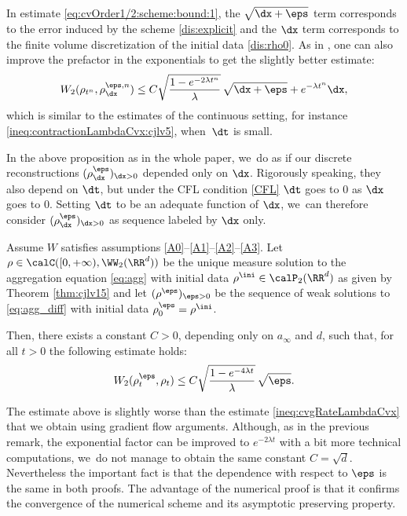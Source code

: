\begin{remark}\mbox{}
In estimate \eqref{eq:cvOrder1/2:scheme:bound:1}, the $\sqrt{\dx + \eps}$ term corresponds to the error induced by the scheme \eqref{dis:explicit} and the $\dx$ term corresponds to the finite volume discretization of the initial data \eqref{dis:rho0}. As in \cite{dlv20}, one can also improve the prefactor in the exponentials to get the slightly better estimate:
\[
W_2(\rho_{t^n},\rho_{\dx}^{\eps,n} ) \leq C \sqrt{\frac{1 - e^{-2\lambda t^n}}{\lambda}}\, \sqrt{\dx + \eps} + e^{-\lambda t^n} \dx,
\]
which is similar to the estimates of the continuous setting, for instance \eqref{ineq:contractionLambdaCvx:cjlv5}, when~$\dt$ is small.
\end{remark}
In the above proposition as in the whole paper, we~do as if our discrete reconstructions $(\rho_{\dx}^\eps)_{\dx >0}$ depended only on $\dx$. Rigorously speaking, they also depend on $\dt$, but under the CFL condition \eqref{CFL} $\dt$ goes to 0 as $\dx$ goes to 0. Setting $\dt$ to be an adequate function of $\dx$, we~can therefore consider $(\rho_{\dx}^\eps)_{\dx >0}$ as sequence labeled by $\dx$ only.
\begin{theorem}\label{thm:cvOrder1/2:scheme}
Assume $W$ satisfies assumptions \eqref{A0}--\eqref{A1}--\eqref{A2}--\eqref{A3}. Let $\rho \in \calC([0,+\infty), \WW_2(\RR^d))$ be the unique measure solution to the aggregation equation \eqref{eq:agg} with initial data $\rho^{\ini} \in \calP_2(\RR^d)$ as given by Theorem \ref{thm:cjlv15} and let $(\rho^\eps)_{\eps > 0}$ be the sequence of weak solutions to \eqref{eq:agg_diff} with initial data $\rho_0^\eps = \rho^{\ini}$.

Then, there exists a constant $C>0$, depending only on $a_\infty$ and $d$, such that, for all $t>0$ the following estimate holds:
\begin{equation}\label{eq:cvOrder1/2:scheme:bound:2}
W_2(\rho_t^\eps,\rho_t) \leq C \sqrt{\frac{1 - e^{-4\lambda t}}{\lambda}}\, \sqrt{\eps}.
\end{equation}
\end{theorem}
\begin{remark}
The estimate above is slightly worse than the estimate \eqref{ineq:cvgRateLambdaCvx} that we obtain using gradient flow arguments. Although, as in the previous remark, the exponential factor can be improved to $e^{-2\lambda t}$ with a bit more technical computations, we~do not manage to obtain the same constant $C=\sqrt{d}$. Nevertheless the important fact is that the dependence with respect to $\eps$ is the same in both proofs. The advantage of the numerical proof is that it confirms the convergence of the numerical scheme and its asymptotic preserving property.
\end{remark}

